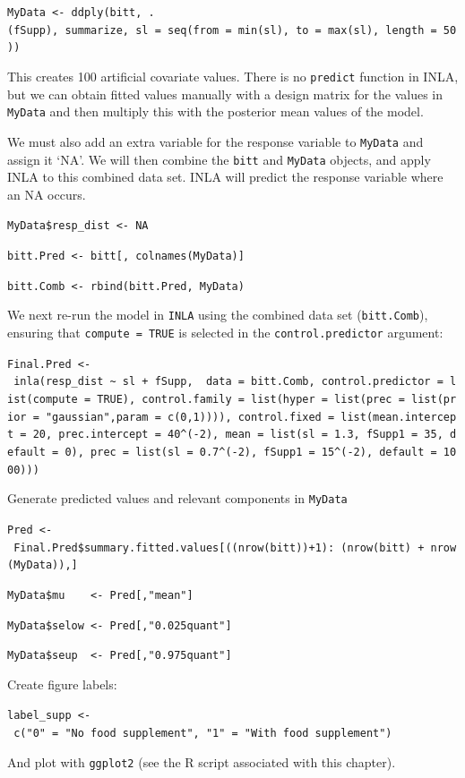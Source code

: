 \documentclass[
]{book}
\begin{document}
\texttt{MyData\ \textless{}-\ ddply(bitt,\ .(fSupp),\ summarize,\ sl\ =\ seq(from\ =\ min(sl),\ to\ =\ max(sl),\ length\ =\ 50))}

This creates 100 artificial covariate values. There is no \texttt{predict} function in INLA, but we can obtain fitted values manually with a design matrix for the values in \texttt{MyData} and then multiply this with the posterior mean values of the model.

We must also add an extra variable for the response variable to \texttt{MyData} and assign it `NA'. We will then combine the \texttt{bitt} and \texttt{MyData} objects, and apply INLA to this combined data set. INLA will predict the response variable where an NA occurs.

\texttt{MyData\$resp\_dist\ \textless{}-\ NA}

\texttt{bitt.Pred\ \textless{}-\ bitt{[},\ colnames(MyData){]}}

\texttt{bitt.Comb\ \textless{}-\ rbind(bitt.Pred,\ MyData)}

We next re-run the model in \texttt{INLA} using the combined data set (\texttt{bitt.Comb}), ensuring that \texttt{compute\ =\ TRUE} is selected in the \texttt{control.predictor} argument:

\texttt{Final.Pred\ \textless{}-\ inla(resp\_dist\ \textasciitilde{}\ sl\ +\ fSupp,\ \ data\ =\ bitt.Comb,\ control.predictor\ =\ list(compute\ =\ TRUE),\ control.family\ =\ list(hyper\ =\ list(prec\ =\ list(prior\ =\ "gaussian",param\ =\ c(0,1)))),\ control.fixed\ =\ list(mean.intercept\ =\ 20,\ prec.intercept\ =\ 40\^{}(-2),\ mean\ =\ list(sl\ =\ 1.3,\ fSupp1\ =\ 35,\ default\ =\ 0),\ prec\ =\ list(sl\ =\ 0.7\^{}(-2),\ fSupp1\ =\ 15\^{}(-2),\ default\ =\ 1000)))}

Generate predicted values and relevant components in \texttt{MyData}

\texttt{Pred\ \textless{}-\ Final.Pred\$summary.fitted.values{[}((nrow(bitt))+1):\ (nrow(bitt)\ +\ nrow(MyData)),{]}}

\texttt{MyData\$mu\ \ \ \ \textless{}-\ Pred{[},"mean"{]}}

\texttt{MyData\$selow\ \textless{}-\ Pred{[},"0.025quant"{]}}

\texttt{MyData\$seup\ \ \textless{}-\ Pred{[},"0.975quant"{]}}

Create figure labels:

\texttt{label\_supp\ \textless{}-\ c("0"\ =\ "No\ food\ supplement",\ "1"\ =\ "With\ food\ supplement")}

And plot with \texttt{ggplot2} (see the R script associated with this chapter).
\end{document}
